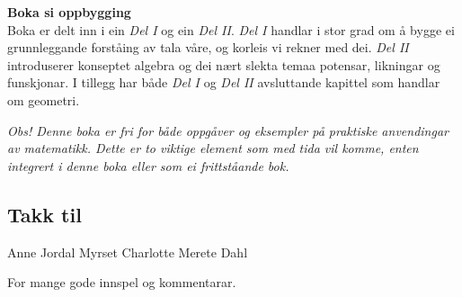 \textbf{Boka si oppbygging}\\
Boka er delt inn i ein \textsl{Del I} og ein \textsl{Del II}. \textsl{Del I} handlar i stor grad om å bygge ei grunnleggande forståing av tala våre, og korleis vi rekner med dei. \textsl{Del II} introduserer konseptet algebra og dei nært slekta temaa potensar, likningar og funskjonar. I tillegg har både \textsl{Del I} og \textsl{Del II} avsluttande kapittel som handlar om geometri. \vsk

\textit{Obs! 
Denne boka er fri for både oppgåver og eksempler på praktiske anvendingar av matematikk. Dette er to viktige element som med tida vil komme, enten integrert i denne boka eller som ei frittståande bok.
}  \vfill
\newpage
\subsection*{Takk til}
Anne Jordal Myrset \os
Charlotte Merete Dahl\vsk

For mange gode innspel og kommentarar.



